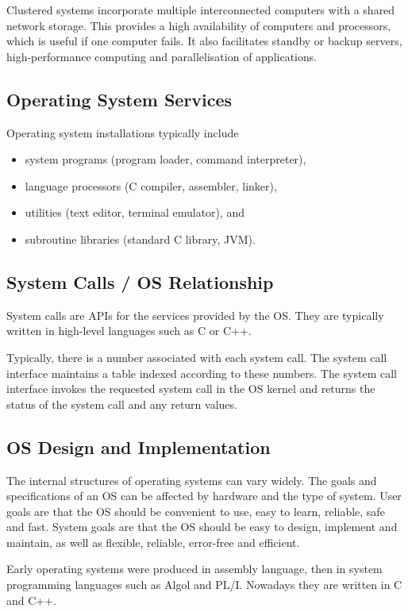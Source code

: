Clustered systems incorporate multiple interconnected computers with a shared network storage.
This provides a high availability of computers and processors, which is useful if one computer fails.
It also facilitates standby or backup servers, high-performance computing and parallelisation of applications.

\subsection{Operating System Services}

Operating system installations typically include
\begin{itemize}
  \item system programs (program loader, command interpreter),
  \item language processors (C compiler, assembler, linker),
  \item utilities (text editor, terminal emulator), and
  \item subroutine libraries (standard C library, JVM).
\end{itemize}

\subsection{System Calls / OS Relationship}

System calls are APIs for the services provided by the OS.
They are typically written in high-level languages such as C or C++.

Typically, there is a number associated with each system call.
The system call interface maintains a table indexed according to these numbers.
The system call interface invokes the requested system call in the OS kernel and returns the status of the system call and any return values.

\subsection{OS Design and Implementation}

The internal structures of operating systems can vary widely.
The goals and specifications of an OS can be affected by hardware and the type of system.
User goals are that the OS should be convenient to use, easy to learn, reliable, safe and fast.
System goals are that the OS should be easy to design, implement and maintain, as well as flexible, reliable, error-free and efficient.

Early operating systems were produced in assembly language, then in system programming languages such as Algol and PL/I.
Nowadays they are written in C and C++.

